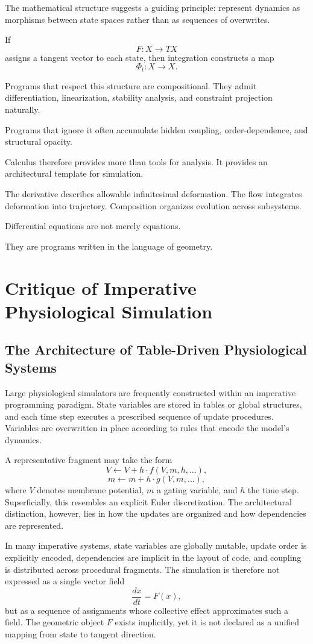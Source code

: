 \documentclass[12pt]{book}
\begin{document}
The mathematical structure suggests a guiding principle: represent dynamics as morphisms between state spaces rather than as sequences of overwrites.

If
\[
F : X \to TX
\]
assigns a tangent vector to each state, then integration constructs a map
\[
\Phi_t : X \to X.
\]

Programs that respect this structure are compositional. They admit differentiation, linearization, stability analysis, and constraint projection naturally.

Programs that ignore it often accumulate hidden coupling, order-dependence, and structural opacity.

Calculus therefore provides more than tools for analysis. It provides an architectural template for simulation.

The derivative describes allowable infinitesimal deformation. The flow integrates deformation into trajectory. Composition organizes evolution across subsystems.

Differential equations are not merely equations.

They are programs written in the language of geometry.

\chapter{Critique of Imperative Physiological Simulation}

\section{The Architecture of Table-Driven Physiological Systems}

Large physiological simulators are frequently constructed within an
imperative programming paradigm. State variables are stored in tables
or global structures, and each time step executes a prescribed
sequence of update procedures. Variables are overwritten in place
according to rules that encode the model's dynamics.

A representative fragment may take the form
\[
V \leftarrow V + h \cdot f(V, m, h, \dots),
\]
\[
m \leftarrow m + h \cdot g(V, m, \dots),
\]
where $V$ denotes membrane potential, $m$ a gating variable, and $h$
the time step. Superficially, this resembles an explicit Euler
discretization. The architectural distinction, however, lies in how
the updates are organized and how dependencies are represented.

In many imperative systems, state variables are globally mutable,
update order is explicitly encoded, dependencies are implicit in the
layout of code, and coupling is distributed across procedural
fragments. The simulation is therefore not expressed as a single
vector field
\[
\frac{dx}{dt} = F(x),
\]
but as a sequence of assignments whose collective effect approximates
such a field. The geometric object $F$ exists implicitly, yet it is
not declared as a unified mapping from state to tangent direction.
\end{document}
